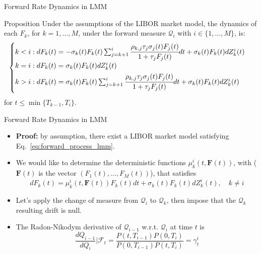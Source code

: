\documentclass{beamer}
\begin{document}
\begin{frame}{Forward Rate Dynamics in LMM}
  \begin{block}{Proposition}
    Under the assumptions of the LIBOR market model, the dynamics of each $F_k$, for $k = 1,\ldots, M$, under the forward measure $\mathcal{Q}_i$ with $i \in \{1,\ldots, M\}$, is:
    \begin{equation*}
      \begin{cases}
	k < i: dF_k(t) = -\sigma_k(t)F_k(t)\sum_{j=k+1}^i\cfrac{\rho_{k,j}\tau_j\sigma_j(t)F_j(t)}{1+\tau_jF_j(t)}dt + \sigma_k(t)F_k(t)dZ^i_k(t) \\ \vspace{0.1cm}
	k = i : dF_k(t) = \sigma_k(t)F_k(t)dZ_k^i(t) \\
	\vspace{0.1cm}
	k > i : dF_k(t) = \sigma_k(t)F_k(t)\sum_{j=k+1}^i\cfrac{\rho_{k,j}\tau_j\sigma_j(t)F_j(t)}{1+\tau_jF_j(t)}dt + \sigma_k(t)F_k(t)dZ^i_k(t)		
      \end{cases}
    \end{equation*}
    for $t \le \min\{T_{k-1}, T_i\}$.
  \end{block}
\end{frame}

\begin{frame}{Forward Rate Dynamics in LMM}
  \begin{itemize}
  \item \textbf{Proof:} by assumption, there exist a LIBOR market model satisfying Eq.~\ref{eq:forward_process_lmm}.
  \item We would like to determine the deterministic functions $\mu_k^i(t, \mathbf{F}(t))$, with ($\mathbf{F}(t)$ is the vector $(F_1(t),\ldots, F_M(t))$), that satisfies
    \begin{equation}
      dF_k(t) = \mu_k^i(t, \mathbf{F}(t))F_k(t)dt + \sigma_k(t)F_k(t)dZ^i_k(t),\quad k\neq i
      \label{eq:forward_dynamics_in_lfm}
    \end{equation}
  \item Let's apply the change of measure from $\mathcal{Q}_i$ to $\mathcal{Q}_k$, then impose that the $\mathcal{Q}_k$ resulting drift is null. 
  \item The Radon-Nikodym derivative of $\mathcal{Q}_{i-1}$ w.r.t. $\mathcal{Q}_i$ at time $t$ is
    \begin{equation*}
      \frac{dQ_{i-1}}{dQ_i}|\mathcal{F}_t = \frac{P(t, T_{i-1})P(0, T_i)}{P(0, T_{i-1})P(t, T_i)} = \gamma^i_t
    \end{equation*}
  \end{itemize}
\end{frame}
\end{document}
